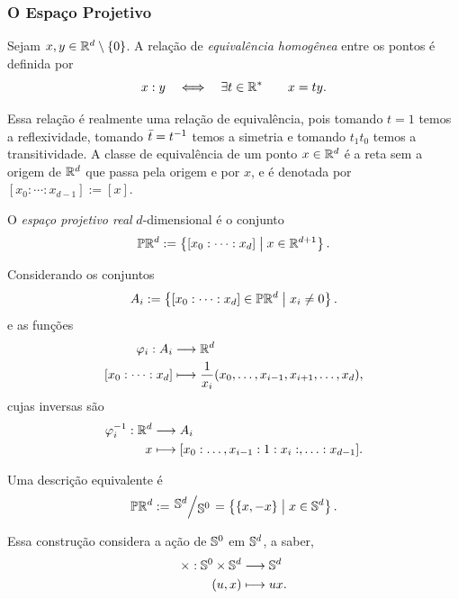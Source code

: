 \subsubsection{O Espaço Projetivo}

\begin{defi}
Sejam $x,y \in \R^d\setminus\{0\}$. A relação de \emph{equivalência homogênea} entre os pontos é definida por
	\begin{equation*}
	x : y \sse \exists t \in \R^* \qquad x = ty.
	\end{equation*}
\end{defi}

Essa relação é realmente uma relação de equivalência, pois tomando $t=1$ temos a reflexividade, tomando $\bar t = t\inv$ temos a simetria e tomando $t_1t_0$ temos a transitividade. A classe de equivalência de um ponto $x \in \R^d$ é a reta sem a origem de $\R^d$ que passa pela origem e por $x$, e é denotada por $[x_0 : \cdots : x_{d-1}] := [x]$.

\begin{defi}
O \emph{espaço projetivo real} $d$-dimensional é o conjunto
	\begin{equation*}
	\pro\R^d := \set{[x_0 : \cdots : x_d]}{x \in \R^{d+1}}.
	\end{equation*}
\end{defi}

Considerando os conjuntos
	\begin{equation*}
	A_i := \set{[x_0 : \cdots : x_d] \in \pro\R^d}{x_i \neq 0}.
	\end{equation*}
e as funções
	\begin{align*}
	\func{\varphi_i}{A_i}{\R^d}{[x_0 : \cdots : x_d]}{\frac{1}{x_i}(x_0,\ldots,x_{i-1},x_{i+1},\ldots,x_d)},
	\end{align*}
cujas inversas são
	\begin{align*}
	\func{\varphi_i\inv}{\R^d}{A_i}{x}{[x_0:\ldots,x_{i-1}:1:x_i:,\ldots:x_{d-1}]}.
	\end{align*}

Uma descrição equivalente é
	\begin{equation*}
	\pro\R^d := \quo{\S^d}{\S^0} = \set{\{x,-x\}}{x \in \S^d}.
	\end{equation*}

Essa construção considera a ação de $\S^0$ em $\S^d$, a saber,
	\begin{align*}
	\func{\times}{\S^0 \times \S^d}{\S^d}{(u,x)}{ux}.
	\end{align*}

